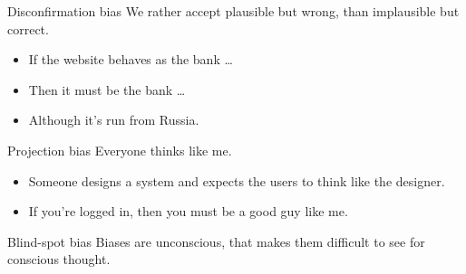 \begin{frame}
  \begin{block}{Disconfirmation bias}
    We rather accept plausible but wrong, than implausible but correct.
  \end{block}

  \pause{}

  \begin{example}
    \begin{itemize}
      \item If the website behaves as the bank \dots
      \item Then it must be the bank \dots
      \item Although it's run from Russia.
    \end{itemize}
  \end{example}
\end{frame}

\begin{frame}
  \begin{block}{Projection bias}
    Everyone thinks like me.
  \end{block}

  \begin{example}
    \begin{itemize}
      \item Someone designs a system and expects the users to think like the 
        designer.
      \item If you're logged in, then you must be a good guy like me.
    \end{itemize}
  \end{example}
\end{frame}

\begin{frame}
  \begin{block}{Blind-spot bias}
    Biases are unconscious, that makes them difficult to see for conscious 
    thought.
  \end{block}
\end{frame}

